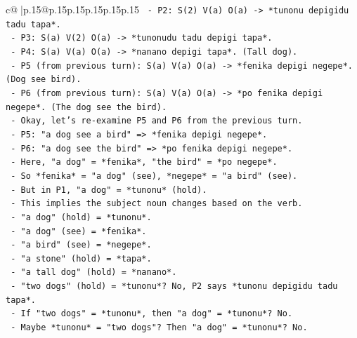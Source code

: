 \documentclass{article}
\begin{document}
{\begin{supertabular}{c@{$\;$}|p{.15\linewidth}@{}p{.15\linewidth}p{.15\linewidth}p{.15\linewidth}p{.15\linewidth}p{.15\linewidth}}
{{{\texttt{                          {-} P2: S(2) V(a) O(a) {-}> *tunonu depigidu tadu tapa*.} \\
\texttt{                          {-} P3: S(a) V(2) O(a) {-}> *tunonudu tadu depigi tapa*.} \\
\texttt{                          {-} P4: S(a) V(a) O(a) {-}> *nanano depigi tapa*. (Tall dog).} \\
\texttt{                          {-} P5 (from previous turn): S(a) V(a) O(a) {-}> *fenika depigi negepe*. (Dog see bird).} \\
\texttt{                          {-} P6 (from previous turn): S(a) V(a) O(a) {-}> *po fenika depigi negepe*. (The dog see the bird).} \\
\texttt{                        {-} Okay, let's re{-}examine P5 and P6 from the previous turn.} \\
\texttt{                          {-} P5: "a dog see a bird" => *fenika depigi negepe*.} \\
\texttt{                          {-} P6: "a dog see the bird" => *po fenika depigi negepe*.} \\
\texttt{                          {-} Here, "a dog" = *fenika*, "the bird" = *po negepe*.} \\
\texttt{                          {-} So *fenika* = "a dog" (see), *negepe* = "a bird" (see).} \\
\texttt{                          {-} But in P1, "a dog" = *tunonu* (hold).} \\
\texttt{                          {-} This implies the subject noun changes based on the verb.} \\
\texttt{                          {-} "a dog" (hold) = *tunonu*.} \\
\texttt{                          {-} "a dog" (see) = *fenika*.} \\
\texttt{                          {-} "a bird" (see) = *negepe*.} \\
\texttt{                          {-} "a stone" (hold) = *tapa*.} \\
\texttt{                          {-} "a tall dog" (hold) = *nanano*.} \\
\texttt{                          {-} "two dogs" (hold) = *tunonu*? No, P2 says *tunonu depigidu tadu tapa*.} \\
\texttt{                            {-} If "two dogs" = *tunonu*, then "a dog" = *tunonu*? No.} \\
\texttt{                            {-} Maybe *tunonu* = "two dogs"? Then "a dog" = *tunonu*? No.} \\
}}}
\end{supertabular}}
\end{document}
